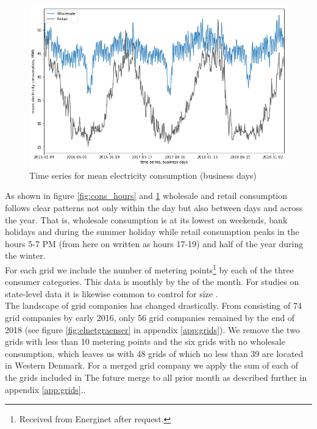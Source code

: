 \begin{figure}[H]
  \centering
  \caption{Time series for mean electricity consumption (business days)}
  \label{fig:cons_time_series}
  \includegraphics[width=1 \textwidth]{03_figures/cons_time series, business days}
\end{figure}
\noindent
As shown in figure \ref{fig:cons_hours} and \ref{fig:cons_time_series} wholesale and retail consumption follows clear patterns not only within the day but also between days and across the year. That is, wholesale consumption is at its lowest on weekends, bank holidays and during the summer holiday while retail consumption peaks in the hours 5-7 PM (from here on written as hours 17-19) and half of the year during the winter.
\medskip\\
For each grid we include the number of metering points\footnote{Received from Energinet after request.} by each of the three consumer categories.  This data is monthly by the  of the month. For studies on state-level data it is likewise common to control for size \citep{burke2017price}.
\medskip\\
The landscape of grid companies has changed drastically. From consisting of 74 grid companies by early 2016, only 56 grid companies remained by the end of 2018 (see figure \ref{fig:elnetgraenser} in appendix \ref{app:grids}). We remove the two grids with less than 10 metering points and the six grids with no wholesale consumption, which leaves us with 48 grids of which no less than 39 are located in Western Denmark. For a merged grid company we apply the sum of each of the grids included in The future merge to all prior month as described further in appendix \ref{app:grids}.. 


